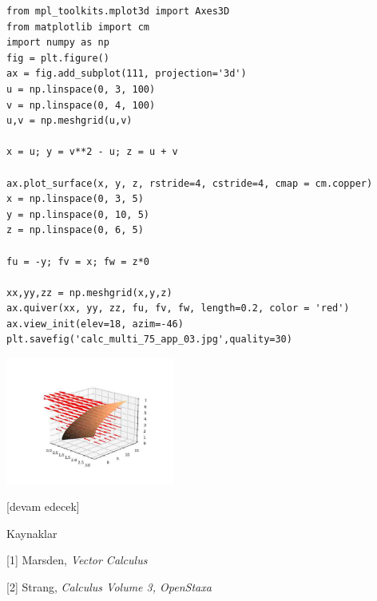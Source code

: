 \documentclass[12pt,fleqn]{article}\usepackage{../../common}
\begin{document}
\begin{verbatim}
from mpl_toolkits.mplot3d import Axes3D
from matplotlib import cm
import numpy as np
fig = plt.figure()
ax = fig.add_subplot(111, projection='3d')
u = np.linspace(0, 3, 100)
v = np.linspace(0, 4, 100)
u,v = np.meshgrid(u,v)

x = u; y = v**2 - u; z = u + v

ax.plot_surface(x, y, z, rstride=4, cstride=4, cmap = cm.copper)
x = np.linspace(0, 3, 5)
y = np.linspace(0, 10, 5)
z = np.linspace(0, 6, 5)

fu = -y; fv = x; fw = z*0

xx,yy,zz = np.meshgrid(x,y,z)
ax.quiver(xx, yy, zz, fu, fv, fw, length=0.2, color = 'red')
ax.view_init(elev=18, azim=-46)
plt.savefig('calc_multi_75_app_03.jpg',quality=30)
\end{verbatim}

\includegraphics[width=15em]{calc_multi_75_app_03.jpg}














[devam edecek]

Kaynaklar

[1] Marsden, {\em Vector Calculus}

[2] Strang, {\em Calculus Volume 3, OpenStaxa}
\end{document}
